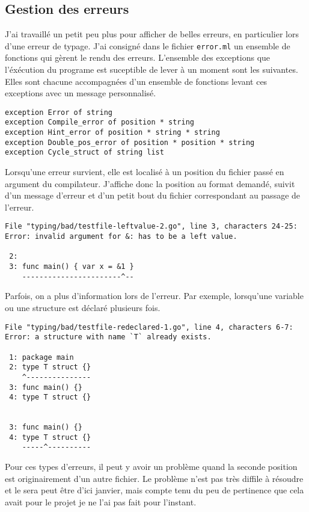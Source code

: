\documentclass{article}
\begin{document}
\subsection{Gestion des erreurs\label{sec:errors}}

J'ai travaillé un petit peu plus pour afficher de belles erreurs, en particulier lors d'une erreur de typage. J'ai consigné dans le fichier \texttt{error.ml} un ensemble de fonctions qui gèrent le rendu des erreurs. L'ensemble des exceptions que l'éxécution du programe est suceptible de lever à un moment sont les suivantes. Elles sont chacune accompagnées d'un ensemble de fonctions levant ces exceptions avec un message personnalisé.

\begin{verbatim}
exception Error of string
exception Compile_error of position * string
exception Hint_error of position * string * string
exception Double_pos_error of position * position * string
exception Cycle_struct of string list
\end{verbatim}

Lorsqu'une erreur survient, elle est localisé à un position du fichier passé en argument du compilateur. J'affiche donc la position au format demandé, suivit d'un message d'erreur et d'un petit bout du fichier correspondant au passage de l'erreur.

\begin{verbatim}
File "typing/bad/testfile-leftvalue-2.go", line 3, characters 24-25:
Error: invalid argument for &: has to be a left value.

 2:
 3: func main() { var x = &1 }
    -----------------------^--
\end{verbatim}

Parfois, on a plus d'information lors de l'erreur. Par exemple, lorsqu'une variable ou une structure est déclaré plusieurs fois.

\begin{verbatim}
File "typing/bad/testfile-redeclared-1.go", line 4, characters 6-7:
Error: a structure with name `T` already exists.

 1: package main
 2: type T struct {}
    ^---------------
 3: func main() {}
 4: type T struct {}


 3: func main() {}
 4: type T struct {}
    -----^----------
\end{verbatim}

Pour ces types d'erreurs, il peut y avoir un problème quand la seconde position est originairement d'un autre fichier. Le problème n'est pas très diffile à résoudre et le sera peut être d'ici janvier, mais compte tenu du peu de pertinence que cela avait pour le projet je ne l'ai pas fait pour l'instant.
\end{document}
